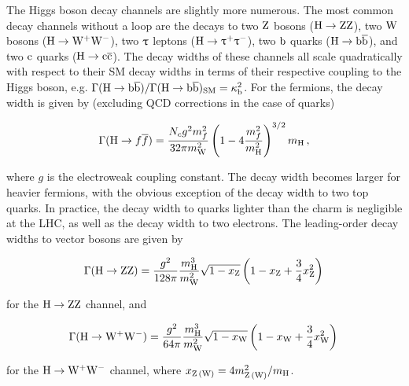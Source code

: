 The Higgs boson decay channels are slightly more numerous.
% 
The most common decay channels without a loop are the decays to two $\mathrm{Z}$ bosons ($\mathrm{H}\to\mathrm{Z}\mathrm{Z}$), two $\mathrm{W}$ bosons ($\mathrm{H}\to\mathrm{W}^+\mathrm{W}^-$), two $\uptau$ leptons ($\mathrm{H}\to\uptau^+\uptau^-$), two $\mathrm{b}$ quarks ($\mathrm{H}\to\mathrm{b}\overline{\mathrm{b}}$), and two $\mathrm{c}$ quarks ($\mathrm{H}\to\mathrm{c}\overline{\mathrm{c}}$).
% 
The decay widths of these channels all scale quadratically with respect to their SM decay widths in terms of their respective coupling to the Higgs boson, e.g. $\Gamma(\mathrm{H}\to\mathrm{b}\overline{\mathrm{b}}) / \Gamma(\mathrm{H}\to\mathrm{b}\overline{\mathrm{b}})_\text{SM} = \kappa_{\mathrm{b}}^2$.
% 
For the fermions, the decay width is given by (excluding QCD corrections in the case of quarks)~\cite{higgshunter}
% 
\begin{linenomath*}
\begin{equation}
\label{eq:brhff}
\Gamma(\mathrm{H} \to f\overline{f})
=
\frac{N_c g^2 m_f^2}{32\pi m_\mathrm{W}^2}
\left( 1-4\frac{m_f^2}{m_{\mathrm{H}}^2} \right)^{ 3/2 }
m_{\mathrm{H}} 
\,,
\end{equation}
\end{linenomath*}
% 
where $g$ is the electroweak coupling constant.
% 
The decay width becomes larger for heavier fermions, with the obvious exception of the decay width to two top quarks.
% 
% 
In practice, the decay width to quarks lighter than the charm is negligible at the LHC, as well as the decay width to two electrons.
% 
The leading-order decay widths to vector bosons are given by~\cite{higgshunter}
% 
\begin{linenomath*}
\begin{equation}
\Gamma(\mathrm{H}\to\mathrm{Z}\mathrm{Z})
=
\frac{g^2}{128\pi} \frac{m_{\mathrm{H}}^3}{m_\mathrm{W}^2}
\sqrt{1-x_\mathrm{Z}}
\left( 1 - x_\mathrm{Z} + \frac{3}{4} x_\mathrm{Z}^2 \right)
\,
\end{equation}
\end{linenomath*}
% 
for the $\mathrm{H}\to\mathrm{Z}\mathrm{Z}$ channel, and
% 
\begin{linenomath*}
\begin{equation}
\Gamma(\mathrm{H}\to\mathrm{W}^+\mathrm{W}^-)
=
\frac{g^2}{64\pi} \frac{m_{\mathrm{H}}^3}{m_\mathrm{W}^2}
\sqrt{1-x_\mathrm{W}}
\left( 1 - x_\mathrm{W} + \frac{3}{4} x_\mathrm{W}^2 \right)
\,
\end{equation}
\end{linenomath*}
% 
for the $\mathrm{H}\to\mathrm{W}^+\mathrm{W}^-$ channel, where $x_{\mathrm{Z} \, (\mathrm{W})} = 4 m_{\mathrm{Z}\,(\mathrm{W})}^2 / m_{\mathrm{H}}$.


